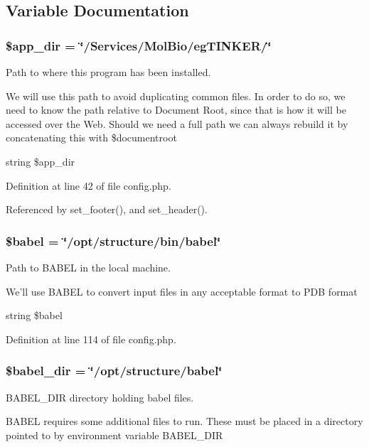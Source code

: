 \subsection{Variable Documentation}
\subsubsection{\setlength{\rightskip}{0pt plus 5cm}\$app\_\-dir = \char`\"{}/Services/Mol\-Bio/eg\-TINKER/\char`\"{}}\label{config_8php_a3}


Path to where this program has been installed. 

We will use this path to avoid duplicating common files. In order to do so, we need to know the path relative to Document Root, since that is how it will be accessed over the Web. Should we need a full path we can always rebuild it by concatenating this with \$documentroot

string \$app\_\-dir 

Definition at line 42 of file config.php.

Referenced by set\_\-footer(), and set\_\-header().
\subsubsection{\setlength{\rightskip}{0pt plus 5cm}\$babel = \char`\"{}/opt/structure/bin/babel\char`\"{}}\label{config_8php_a8}


Path to BABEL in the local machine. 

We'll use BABEL to convert input files in any acceptable format to PDB format

string \$babel 

Definition at line 114 of file config.php.
\subsubsection{\setlength{\rightskip}{0pt plus 5cm}\$babel\_\-dir = \char`\"{}/opt/structure/babel\char`\"{}}\label{config_8php_a9}


BABEL\_\-DIR directory holding babel files. 

BABEL requires some additional files to run. These must be placed in a directory pointed to by environment variable BABEL\_\-DIR

